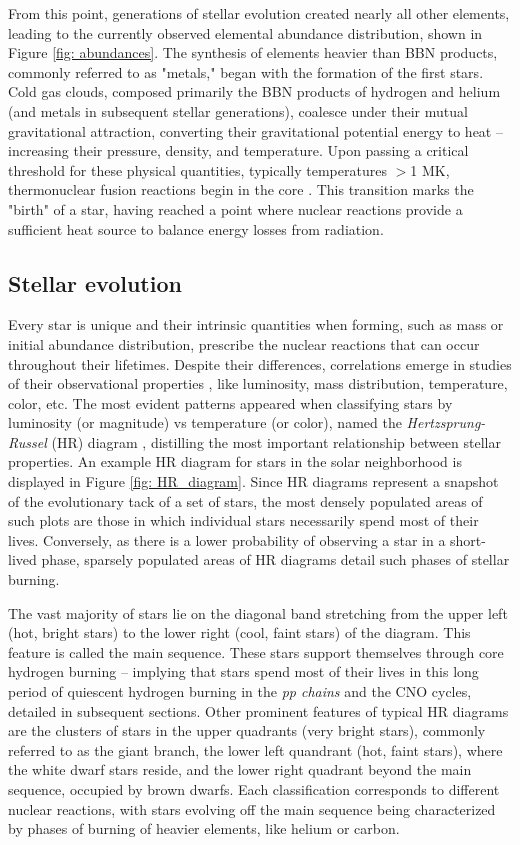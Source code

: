 From this point, generations of stellar evolution created nearly all other elements, leading to the currently observed elemental abundance distribution, shown in Figure \ref{fig: abundances}. The synthesis of elements heavier than BBN products, commonly referred to as "metals," began with the formation of the first stars. Cold gas clouds, composed primarily the BBN products of hydrogen and helium (and metals in subsequent stellar generations), coalesce under their mutual gravitational attraction, converting their gravitational potential energy to heat -- increasing their pressure, density, and temperature. Upon passing a critical threshold for these physical quantities, typically temperatures $>$1 MK, thermonuclear fusion reactions begin in the core \cite{RyanNortonBook}. This transition marks the "birth" of a star, having reached a point where nuclear reactions provide a sufficient heat source to balance energy losses from radiation. 


\subsection{Stellar evolution}

Every star is unique and their intrinsic quantities when forming, such as mass or initial abundance distribution, prescribe the nuclear reactions that can occur throughout their lifetimes. Despite their differences, correlations emerge in studies of their observational properties , like luminosity, mass distribution, temperature, color, etc. The most evident patterns appeared when classifying stars by luminosity (or magnitude) vs temperature (or color), named the \textit{Hertzsprung-Russel} (HR) diagram \cite{CarrollOstlieBook, IliadisBook, RyanNortonBook}, distilling the most important relationship between stellar properties. An example HR diagram for stars in the solar neighborhood is displayed in Figure \ref{fig: HR_diagram}. Since HR diagrams represent a snapshot of the evolutionary tack of a set of stars, the most densely populated areas of such plots are those in which individual stars necessarily spend most of their lives. Conversely, as there is a lower probability of observing a star in a short-lived phase, sparsely populated areas of HR diagrams detail such phases of stellar burning. 

The vast majority of stars lie on the diagonal band stretching from the upper left (hot, bright stars) to the lower right (cool, faint stars) of the diagram. This feature is called the main sequence. These stars support themselves through core hydrogen burning -- implying that stars spend most of their lives in this long period of quiescent hydrogen burning in the \textit{pp chains} and the CNO cycles, detailed in subsequent sections. Other prominent features of typical HR diagrams are the clusters of stars in the upper quadrants (very bright stars), commonly referred to as the giant branch, the lower left quandrant (hot, faint stars), where the white dwarf stars reside, and the lower right quadrant beyond the main sequence, occupied by brown dwarfs. Each classification corresponds to different nuclear reactions, with stars evolving off the main sequence being characterized by phases of burning of heavier elements, like helium or carbon. 

